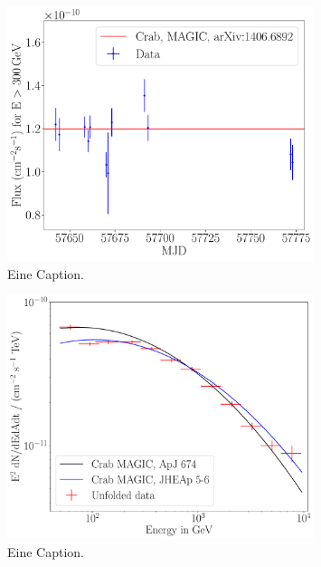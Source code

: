 \begin{figure}
  \centering
  \includegraphics[width=0.8\textwidth]{figures/flute_lichtkurve.pdf}
  \caption{Eine Caption.}
\end{figure}

\begin{figure}
  \centering
  \includegraphics[width=0.8\textwidth]{figures/combunfold_energyspectrum.pdf}
  \caption{Eine Caption.}
\end{figure}
